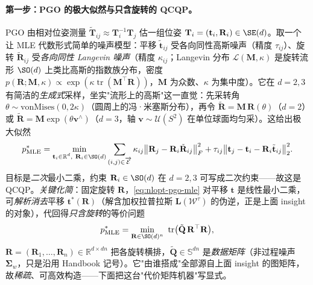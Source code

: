 \paragraph{第一步：PGO 的极大似然与只含旋转的 QCQP。}\cite{rosen2019sesync}
PGO 由相对位姿测量 $\tilde{\mathbf{T}}_{ij}\approx\mathbf{T}_i^{-1}\mathbf{T}_j$ 估一组位姿 $\mathbf{T}_i=(\mathbf{t}_i,\mathbf{R}_i)\in\SE(d)$。取一个让 MLE 代数形式简单的噪声模型：平移 $\tilde{\mathbf{t}}_{ij}$ 受各向同性高斯噪声（精度 $\tau_{ij}$）、旋转 $\tilde{\mathbf{R}}_{ij}$ 受\emph{各向同性 Langevin 噪声}（精度 $\kappa_{ij}$；Langevin 分布 $\mathcal{L}(\mathbf{M},\kappa)$ 是旋转流形 $\SO(d)$ 上类比高斯的指数族分布，密度 $p(\mathbf{R};\mathbf{M},\kappa)\propto\exp(\kappa\operatorname{tr}(\mathbf{M}^\top\mathbf{R}))$，$\mathbf{M}$ 为众数、$\kappa$ 为集中度）。它在 $d{=}2,3$ 有简洁的\emph{生成式}采样，坐实"流形上的高斯"这一直觉：先采转角 $\theta\sim\mathrm{vonMises}(0,2\kappa)$（圆周上的冯·米塞斯分布），再令 $\tilde{\mathbf{R}}=\mathbf{M}\,\mathbf{R}(\theta)$（$d{=}2$）或 $\tilde{\mathbf{R}}=\mathbf{M}\exp(\theta\mathbf{v}^\wedge)$（$d{=}3$，轴 $\mathbf{v}\sim\mathcal{U}(S^2)$ 在单位球面均匀采）。这给出极大似然
\begin{equation}
  p^*_{\mathrm{MLE}}=\min_{\substack{\mathbf{t}_i\in\mathbb{R}^d,\ \mathbf{R}_i\in\SO(d)}}
  \sum_{(i,j)\in\overrightarrow{\mathcal{E}}}\kappa_{ij}\big\|\mathbf{R}_j-\mathbf{R}_i\tilde{\mathbf{R}}_{ij}\big\|_F^2
  +\tau_{ij}\big\|\mathbf{t}_j-\mathbf{t}_i-\mathbf{R}_i\tilde{\mathbf{t}}_{ij}\big\|_2^2.
  \label{eq:nlopt-pgo-mle}
\end{equation}
目标是\emph{二次}最小二乘，约束 $\mathbf{R}_i\in\SO(d)$ 在 $d{=}2,3$ 可写成二次约束——故这是 QCQP。\emph{关键化简}：固定旋转 $\mathbf{R}$，\cref{eq:nlopt-pgo-mle} 对平移 $\mathbf{t}$ 是线性最小二乘，可\emph{解析消去}平移 $\mathbf{t}^*(\mathbf{R})$（解含加权拉普拉斯 $\mathbf{L}(\mathcal{W}^\tau)$ 的伪逆，正是上面 insight 的对象），代回得\emph{只含旋转}的等价问题
\begin{equation}
  p^*_{\mathrm{MLE}}=\min_{\mathbf{R}\in\SO(d)^n}\ \operatorname{tr}\!\big(\tilde{\mathbf{Q}}\,\mathbf{R}^\top\mathbf{R}\big),
  \label{eq:nlopt-pgo-rot}
\end{equation}
$\mathbf{R}=(\mathbf{R}_1,\dots,\mathbf{R}_n)\in\mathbb{R}^{d\times dn}$ 把各旋转横排，$\tilde{\mathbf{Q}}\in\mathbb{S}^{dn}$ 是\emph{数据矩阵}（非过程噪声 $\boldsymbol{\Sigma}_w$，只是沿用 Handbook 记号）。它"由谁搭成"全部源自上面 insight 的图矩阵，故\emph{稀疏}、可高效构造——下面把这台"代价矩阵机器"写显式。

